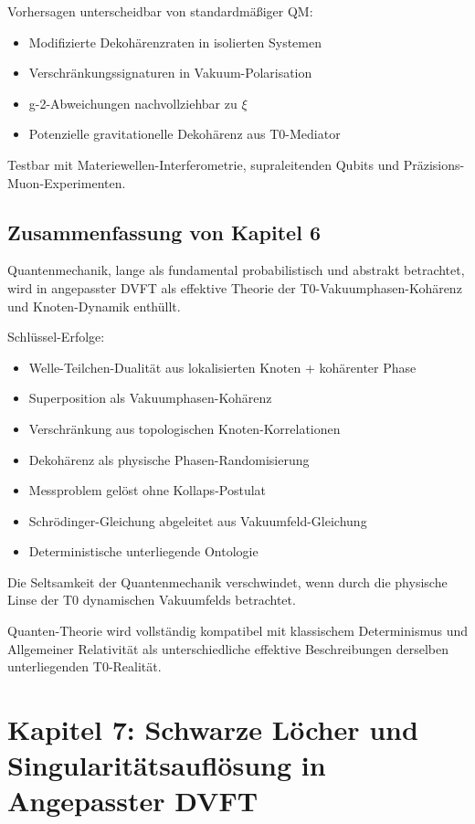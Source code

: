 	Vorhersagen unterscheidbar von standardmäßiger QM:
	\begin{itemize}
		\item Modifizierte Dekohärenzraten in isolierten Systemen
		\item Verschränkungssignaturen in Vakuum-Polarisation
		\item g-2-Abweichungen nachvollziehbar zu $\xi$
		\item Potenzielle gravitationelle Dekohärenz aus T0-Mediator
	\end{itemize}
	
	Testbar mit Materiewellen-Interferometrie, supraleitenden Qubits und Präzisions-Muon-Experimenten.
	
	\subsection{Zusammenfassung von Kapitel 6}
	
	Quantenmechanik, lange als fundamental probabilistisch und abstrakt betrachtet, wird in angepasster DVFT als effektive Theorie der T0-Vakuumphasen-Kohärenz und Knoten-Dynamik enthüllt.
	
	Schlüssel-Erfolge:
	\begin{itemize}
		\item Welle-Teilchen-Dualität aus lokalisierten Knoten + kohärenter Phase
		\item Superposition als Vakuumphasen-Kohärenz
		\item Verschränkung aus topologischen Knoten-Korrelationen
		\item Dekohärenz als physische Phasen-Randomisierung
		\item Messproblem gelöst ohne Kollaps-Postulat
		\item Schrödinger-Gleichung abgeleitet aus Vakuumfeld-Gleichung
		\item Deterministische unterliegende Ontologie
	\end{itemize}
	
	Die Seltsamkeit der Quantenmechanik verschwindet, wenn durch die physische Linse der T0 dynamischen Vakuumfelds betrachtet.
	
	Quanten-Theorie wird vollständig kompatibel mit klassischem Determinismus und Allgemeiner Relativität als unterschiedliche effektive Beschreibungen derselben unterliegenden T0-Realität.
	
	\section{Kapitel 7: Schwarze Löcher und Singularitätsauflösung in Angepasster DVFT}
	
